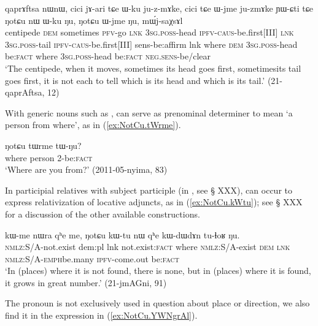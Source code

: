 \begin{exe}
\ex \label{ex:NotCu.nW.Wku.Nu}
\gll qaprɤftsa nɯnɯ, cici jɤ-ari tɕe ɯ-ku ju-z-mɤke, cici tɕe ɯ-jme ju-zmɤke ɲɯ-ɕti tɕe
ŋotɕu nɯ ɯ-ku ŋu, ŋotɕu ɯ-jme ŋu, mɯ́j-saχsɤl \\
centipede \textsc{dem} sometimes \textsc{pfv}-go \textsc{lnk} \textsc{3sg.poss}-head \textsc{ipfv-caus}-be.first[III] \textsc{lnk} \textsc{3sg.poss}-tail \textsc{ipfv-caus}-be.first[III] sens-be:affirm lnk where \textsc{dem} \textsc{3sg.poss}-head be:\textsc{fact} where \textsc{3sg.poss}-head be:\textsc{fact} \textsc{neg.sens}-be/clear \\
\glt `The centipede, when it moves, sometimes its head goes first, sometimesits tail goes first, it is not each to tell which is its head and which is its tail.' (21-qaprAftsa, 12)
\end{exe} 


With generic nouns such as ,  can serve as prenominal determiner to mean `a person from where', as in (\ref{ex:NotCu.tWrme}).

\begin{exe}
\ex \label{ex:NotCu.tWrme}
\gll ŋotɕu tɯrme tɯ-ŋu? \\
where person 2-be:\textsc{fact} \\
\glt `Where are you from?' (2011-05-nyima, 83)
\end{exe} 

In participial relatives with subject participle (in , see § XXX),  can occur to express relativization of locative adjuncts, as in  (\ref{ex:NotCu.kWtu}); see § XXX for a discussion of the other available constructions.

\begin{exe}
\ex \label{ex:NotCu.kWtu}
\gll kɯ-me nɯra qʰe me,  ŋotɕu kɯ-tu nɯ qʰe kɯ-dɯ\redp{}dɤn tu-ɬoʁ ŋu. \\
\textsc{nmlz}:S/A-not.exist dem:pl lnk not.exist:\textsc{fact} where \textsc{nmlz}:S/A-exist \textsc{dem} \textsc{lnk} \textsc{nmlz}:S/A-\textsc{emph}\redp{}be.many \textsc{ipfv}-come.out be:\textsc{fact} \\
\glt `In (places) where it is not found, there is none, but in (places) where it is found, it grows in great number.' (21-jmAGni, 91)
\end{exe} 

The pronoun  is not exclusively used in question about place or direction, we also find it in the expression in (\ref{ex:NotCu.YWNgrAl}).

